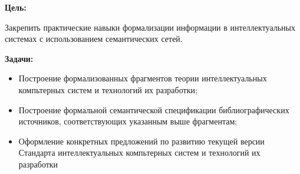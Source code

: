 
\textbf{Цель:}

Закрепить практические навыки формализации информации в интеллектуальных системах с использованием семантических сетей.
\bigskip

\textbf{Задачи:}

\begin{itemize}
    \item Построение формализованных фрагментов теории интеллектуальных компьтерных систем и технологий их разработки;
    \item Построение формальной семантической спецификации библиографических источников, соответствующих указанным выше фрагментам;
    \item Оформление конкретных предложений по развитию текущей версии Стандарта интеллектуальных компьтерных систем и технологий их разработки
\end{itemize}